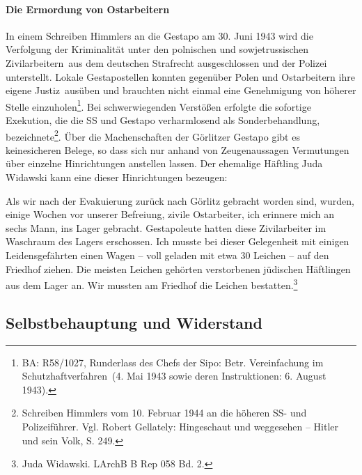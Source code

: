 \documentclass[a4paper,12pt,ngerman,
]{nisebook}
\begin{document}
\paragraph{Die Ermordung von Ostarbeitern}
In einem Schreiben Himmlers an die Gestapo am 30. Juni 1943 wird die \glqq Verfolgung der Kriminalität unter den polnischen und sowjetrussischen Zivilarbeitern\grqq~aus dem deutschen Strafrecht ausgeschlossen und der Polizei unterstellt. Lokale Gestapo\-stellen konnten gegenüber Polen und Ostarbeitern ihre eigene \glqq Justiz\grqq~ausüben und brauchten nicht einmal eine Genehmigung von höherer Stelle einzuholen\footnote{BA: R58/1027, Runderlass des Chefs der Sipo: Betr. \glqq Vereinfachung im Schutzhaftverfahren\grqq~(4. Mai 1943 sowie deren Instruktionen: 6. August 1943).}. Bei schwerwiegenden Verstößen erfolgte die sofortige Exekution, die die SS und Gestapo verharmlosend als \glqq Sonderbehandlung\grqq, bezeichnete\footnote{Schreiben Himmlers vom 10. Februar 1944 an die höheren SS- und Polizeiführer. Vgl. Robert Gellately: Hingeschaut und weggesehen -- Hitler und sein Volk, S. 249.}. Über die Machenschaften der Görlitzer Gestapo gibt es keine\linebreak\newpage sicheren Belege, so dass sich nur anhand von Zeugenaussagen Vermutungen über einzelne Hinrichtungen anstellen lassen. Der ehemalige Häftling Juda Widawski kann eine dieser Hinrichtungen bezeugen:
\begin{leftbar}
Als wir nach der Evakuierung zurück nach Görlitz gebracht worden sind, wurden, einige Wochen vor unserer Befreiung, zivile Ostarbeiter, ich erinnere mich an sechs Mann, ins Lager gebracht. Gestapoleute hatten diese Zivilarbeiter im Waschraum des Lagers erschossen. Ich musste bei dieser Gelegenheit mit einigen Leidensgefährten einen Wagen -- voll geladen mit etwa 30 Leichen -- auf den Friedhof ziehen. Die meisten Leichen gehörten verstorbenen jüdischen Häftlingen aus dem Lager an. Wir mussten am Friedhof die Leichen bestatten.\footnote{Juda Widawski. LArchB B Rep 058 Bd. 2.}
\end{leftbar}



\subsection{Selbstbehauptung und Widerstand}
\end{document}
